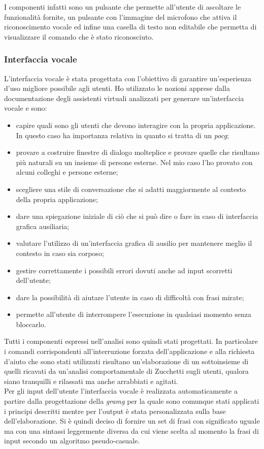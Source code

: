 		I componenti infatti sono un pulsante che permette all'utente di ascoltare le funzionalità fornite, un pulsante con l'immagine del microfono che attiva il riconoscimento vocale ed infine una casella di testo non editabile che permetta di visualizzare il comando che è stato riconosciuto.		
		\subsubsection{Interfaccia vocale}
		L'interfaccia vocale è stata progettata con l'obiettivo di garantire un'esperienza d'uso migliore possibile agli utenti. Ho utilizzato le nozioni apprese dalla documentazione degli assistenti virtuali analizzati per generare un'interfaccia vocale e sono:
		\begin{itemize}
			\item capire quali sono gli utenti che devono interagire con la propria applicazione. In questo caso ha importanza relativa in quanto si tratta di un \emph{\gls{pocg}};
			\item provare a costruire finestre di dialogo molteplice e provare quelle che risultano più naturali su un insieme di persone esterne. Nel mio caso l'ho provato con alcuni colleghi e persone esterne;
			\item scegliere una stile di conversazione che si adatti maggiormente al contesto della propria applicazione;
			\item dare una spiegazione iniziale di ciò che si può dire o fare in caso di interfaccia grafica ausiliaria;
			\item valutare l'utilizzo di un'interfaccia grafica di ausilio per mantenere meglio il contesto in caso sia corposo;
			\item gestire correttamente i possibili errori dovuti anche ad input scorretti dell'utente;
			\item dare la possibilità di aiutare l'utente in caso di difficoltà con frasi mirate;
			\item permette all'utente di interrompere l'esecuzione in qualsiasi momento senza bloccarlo.
		\end{itemize}		
		Tutti i componenti espressi nell'analisi sono quindi stati progettati. In particolare i comandi corrispondenti all'interruzione forzata dell'applicazione e alla richiesta d'aiuto che sono stati utilizzati risultano un'elaborazione di un sottoinsieme di quelli ricavati da un'analisi comportamentale di Zucchetti sugli utenti, qualora siano tranquilli e rilassati ma anche arrabbiati e agitati. \\
		Per gli input dell'utente l'interfaccia vocale è realizzata automaticamente a partire dalla progettazione della \emph{\gls{gramg}} per la quale sono comunque stati applicati i principi descritti mentre per l'output è stata personalizzata sulla base dell'elaborazione. Si è quindi deciso di fornire un set di frasi con significato uguale ma con una sintassi leggermente diversa da cui viene scelta al momento la frasi di input secondo un algoritmo pseudo-casuale.
